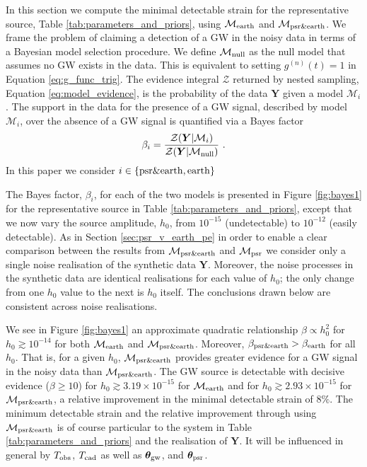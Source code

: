 \documentclass[fleqn,usenatbib,useAMS]{mnras}
\begin{document}
In this section we compute the minimal detectable strain for the representative source, Table \ref{tab:parameters_and_priors}, using $\mathcal{M}_{\rm earth}$ and $\mathcal{M}_{\rm psr \& earth}$. We frame the problem of claiming a detection of a GW in the noisy data in terms of a Bayesian model selection procedure. We define $\mathcal{M}_{\rm null}$ as the null model that assumes no GW exists in the data. This is equivalent to setting $g^{(n)}(t)=1$ in Equation \eqref{eq:g_func_trig}. The evidence integral $\mathcal{Z}$ returned by nested sampling, Equation \eqref{eq:model_evidence}, is the probability of the data $\boldsymbol{Y}$ given a model $\mathcal{M}_i$. The support in the data for the presence of a GW signal, described by model $\mathcal{M}_i$, over the absence of a GW signal is quantified via a Bayes factor
		\begin{equation}
			\beta_i = \frac{\mathcal{Z}(\boldsymbol{Y} | \mathcal{M}_i)}{\mathcal{Z}(\boldsymbol{Y} | \mathcal{M}_{\rm null})} \ . \label{eq:bayes}
		\end{equation}
In this paper we consider $i \in \left \{ \rm psr \& earth, earth \right \}$ \newline 
	
	
The Bayes factor, $\beta_i$, for each of the two models is presented in Figure \ref{fig:bayes1} for the representative source in Table \ref{tab:parameters_and_priors}, except that we now vary the source amplitude, $h_0$, from $10^{-15}$ (undetectable) to $10^{-12}$ (easily detectable). As in Section \ref{sec:psr_v_earth_pe} in order to enable a clear comparison between the results from $\mathcal{M}_{\rm psr \& earth}$ and $\mathcal{M}_{\rm psr}$ we consider only a single noise realisation of the synthetic data $\boldsymbol{Y}$. Moreover, the noise processes in the synthetic data are identical realisations for each value of $h_0$; the only change from one $h_0$ value to the next is $h_0$ itself. The conclusions drawn below are consistent across noise realisations. \newline 


	
We see in Figure \ref{fig:bayes1} an approximate quadratic relationship $\beta \propto h_0^2$ for $h_0 \gtrsim 10^{-14}$ for both $\mathcal{M}_{\rm earth}$ and $\mathcal{M}_{\rm psr \& earth}$. Moreover, $\beta_{\rm psr \& earth} > \beta_{\rm earth}$ for all $h_0$. That is, for a given $h_0$, $\mathcal{M}_{\rm psr \& earth}$ provides greater evidence for a GW signal in the noisy data than $\mathcal{M}_{\rm psr \& earth}$. The GW source is detectable with decisive evidence ($\beta \geq 10$) for $h_0 \gtrsim 3.19 \times 10^{-15}$ for  $\mathcal{M}_{\rm earth}$ and for $h_0 \gtrsim 2.93 \times 10^{-15}$ for  $\mathcal{M}_{\rm psr \& earth}$, a relative improvement in the minimal detectable strain of $8\%$. The minimum detectable strain and the relative improvement through using $\mathcal{M}_{\rm psr \& earth}$ is of course particular to the system in Table \ref{tab:parameters_and_priors} and the realisation of $\boldsymbol{Y}$. It will be influenced in general by $T_{\rm obs}$, $T_{\rm cad}$ as well as ${\boldsymbol{\theta}}_{\rm gw}$, and ${\boldsymbol{\theta}}_{\rm psr}$. 
		
\end{document}
